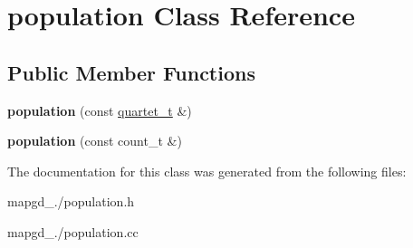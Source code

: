 \hypertarget{classpopulation}{\section{population Class Reference}
\label{classpopulation}
}
\subsection*{Public Member Functions}
\begin{DoxyCompactItemize}
\item 
\hypertarget{classpopulation_a566b82ba92ef99a0c19ed75aad5bc519}{{\bfseries population} (const \hyperlink{structquartet}{quartet\-\_\-t} \&)}\label{classpopulation_a566b82ba92ef99a0c19ed75aad5bc519}

\item 
\hypertarget{classpopulation_a3d2a3774545fdcb720200a369c15f74e}{{\bfseries population} (const count\-\_\-t \&)}\label{classpopulation_a3d2a3774545fdcb720200a369c15f74e}

\end{DoxyCompactItemize}


The documentation for this class was generated from the following files\-:\begin{DoxyCompactItemize}
\item 
mapgd\-\_./population.\-h\item 
mapgd\-\_./population.\-cc\end{DoxyCompactItemize}
